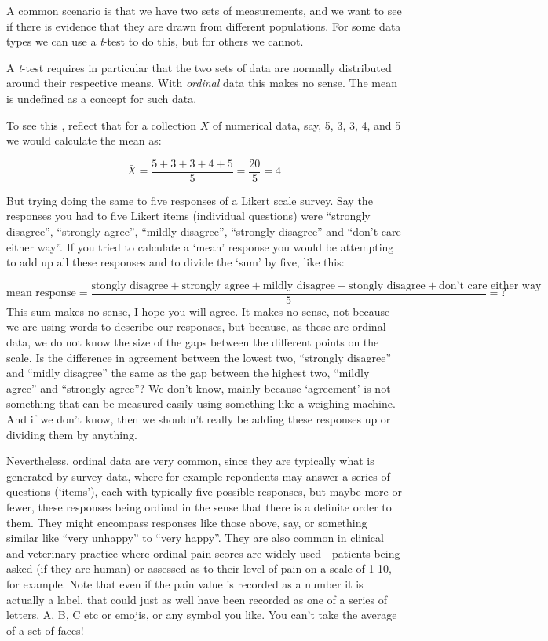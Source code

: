 \documentclass[
  letterpaper,
  DIV=11,
  numbers=noendperiod]{scrreprt}
\begin{document}
A common scenario is that we have two sets of measurements, and we want
to see if there is evidence that they are drawn from different
populations. For some data types we can use a \emph{t}-test to do this,
but for others we cannot.

A \emph{t}-test requires in particular that the two sets of data are
normally distributed around their respective means. With \emph{ordinal}
data this makes no sense. The mean is undefined as a concept for such
data.

To see this , reflect that for a collection \(X\) of numerical data,
say, 5, 3, 3, 4, and 5 we would calculate the mean as:

\[
\bar{X} = \frac{5+3+3+4+5}{5} = \frac{20}{5}=4
\]

But trying doing the same to five responses of a Likert scale survey.
Say the responses you had to five Likert items (individual questions)
were ``strongly disagree'', ``strongly agree'', ``mildly disagree'',
``strongly disagree'' and ``don't care either way''. If you tried to
calculate a `mean' response you would be attempting to add up all these
responses and to divide the `sum' by five, like this:

\[\text{mean response}=\frac{\text{stongly disagree}+\text{strongly agree}+\text{mildly disagree}+\text{stongly disagree}+\text{don't care either way}}{5} = ?
\] This sum makes no sense, I hope you will agree. It makes no sense,
not because we are using words to describe our responses, but because,
as these are ordinal data, we do not know the size of the gaps between
the different points on the scale. Is the difference in agreement
between the lowest two, ``strongly disagree'' and ``midly disagree'' the
same as the gap between the highest two, ``mildly agree'' and ``strongly
agree''? We don't know, mainly because `agreement' is not something that
can be measured easily using something like a weighing machine. And if
we don't know, then we shouldn't really be adding these responses up or
dividing them by anything.

Nevertheless, ordinal data are very common, since they are typically
what is generated by survey data, where for example repondents may
answer a series of questions (`items'), each with typically five
possible responses, but maybe more or fewer, these responses being
ordinal in the sense that there is a definite order to them. They might
encompass responses like those above, say, or something similar like
``very unhappy'' to ``very happy''. They are also common in clinical and
veterinary practice where ordinal pain scores are widely used - patients
being asked (if they are human) or assessed as to their level of pain on
a scale of 1-10, for example. Note that even if the pain value is
recorded as a number it is actually a label, that could just as well
have been recorded as one of a series of letters, A, B, C etc or emojis,
or any symbol you like. You can't take the average of a set of faces!
\end{document}
